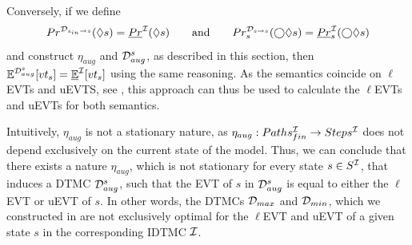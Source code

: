 Conversely, if we define
\[Pr^{\mathcal{D}_{s_{in}\rightarrow s}}(\lozenge s) = \underline{Pr}^{\mathcal{I}}(\lozenge s) \qquad \text{and} \qquad Pr^{\mathcal{D}_{s\rightarrow s}}_s(\bigcirc\lozenge s) = \underline{Pr}^{\mathcal{I}}_s(\bigcirc\lozenge s)\]
and construct $\eta_{aug}$ and $\mathcal{D}_{aug}^s$, as described in this section, then $\mathbb{E}^{\mathcal{D}_{aug}^s}[vt_s] = \mathbb{\underline{E}}^{\mathcal{I}}[vt_s]$ using the same reasoning. As the semantics coincide on $\ell$EVTs and uEVTS, see , this approach can thus be used to calculate the $\ell$EVTs and uEVTs for both semantics. 

Intuitively, $\eta_{aug}$ is not a stationary nature, as $\eta_{aug}: Paths_{fin}^{\mathcal{I}} \rightarrow Steps^{\mathcal{I}}$ does not depend exclusively on the current state of the model. Thus, we can conclude that there exists a nature $\eta_{aug}$, which is not stationary for every state $s\in S^{\mathcal{I}}$, that induces a DTMC $\mathcal{D}_{aug}^s$, such that the EVT of $s$ in $\mathcal{D}_{aug}^s$ is equal to either the $\ell$EVT or uEVT of $s$. In other words, the DTMCs $\mathcal{D}_{max}$ and $\mathcal{D}_{min}$, which we constructed in  are not exclusively optimal for the $\ell$EVT and uEVT of a given state $s$ in the corresponding IDTMC $\mathcal{I}$. 


    
